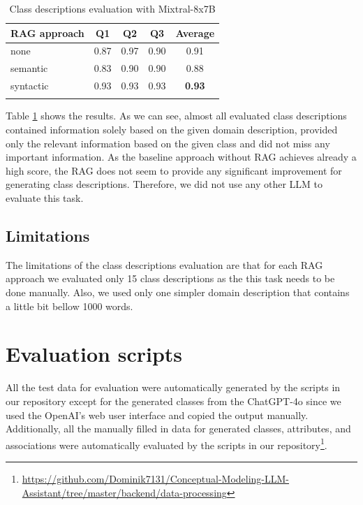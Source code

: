 \begin{table}[!h]
    \scriptsize
    \centering
    \setlength{\tabcolsep}{0.5em}
    \begin{tabular}{lcccc}
     \toprule
        RAG approach & Q1 & Q2 & Q3 & Average \\
    \toprule
    
    \addlinespace
         none       & 0.87 & 0.97 & 0.90 & 0.91 \\
    	 semantic   & 0.83 & 0.90 & 0.90 & 0.88 \\
         syntactic  & 0.93 & 0.93 & 0.93 & \textbf{0.93} \\
    \addlinespace
    \bottomrule
    \addlinespace
    \end{tabular}
    \caption{Class descriptions evaluation with Mixtral-8x7B}
    \label{tab:mixtral-classes-descriptions}
\end{table}

Table \ref{tab:mixtral-classes-descriptions} shows the results. As we can see, almost all evaluated class descriptions contained information solely based on the given domain description, provided only the relevant information based on the given class and did not miss any important information. As the baseline approach without RAG achieves already a high score, the RAG does not seem to provide any significant improvement for generating class descriptions. Therefore, we did not use any other LLM to evaluate this task.


\subsection{Limitations}

The limitations of the class descriptions evaluation are that for each RAG approach we evaluated only 15 class descriptions as the this task needs to be done manually. Also, we used only one simpler domain description that contains a little bit bellow 1000 words.


\section{Evaluation scripts}

All the test data for evaluation were automatically generated by the scripts in our repository except for the generated classes from the ChatGPT-4o since we used the OpenAI's web user interface and copied the output manually. Additionally, all the manually filled in data for generated classes, attributes, and associations were automatically evaluated by the scripts in our repository\footnote{\url{https://github.com/Dominik7131/Conceptual-Modeling-LLM-Assistant/tree/master/backend/data-processing}}.


